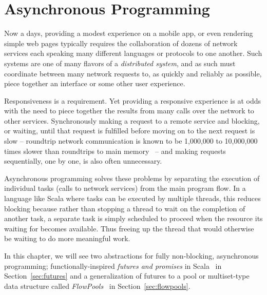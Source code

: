 \chapter{Asynchronous Programming}

Now a days, providing a modest experience on a mobile app, or even rendering
simple web pages typically requires the collaboration of dozens of network
services each speaking many different languages or protocols to one another.
Such systems are one of many flavors of a {\em distributed system}, and as such
must coordinate between many network requests to, as quickly and reliably as
possible, piece together an interface or some other user experience.

Responsiveness is a requirement. Yet providing a responsive experience is at
odds with the need to piece together the results from many calls over the
network to other services. Synchronously making a request to a remote service
and blocking, or waiting, until that request is fulfilled before moving on to
the next request is slow -- roundtrip network communication is known to be
1,000,000 to 10,000,000 times slower than roundtrips to main
memory~\cite{LatencyNumbersEveryProgrammerShouldKnow} -- and making requests
sequentially, one by one, is also often unnecessary.

Asynchronous programming solves these problems by separating the execution of
individual tasks (\eg calls to network services) from the main program flow. In
a language like Scala where tasks can be executed by multiple threads, this
reduces blocking because rather than stopping a thread to wait on the completion
of another task, a separate task is simply scheduled to proceed when the
resource its waiting for becomes available. Thus freeing up the thread that
would otherwise be waiting to do more meaningful work.

In this chapter, we will see two abstractions for fully non-blocking,
asynchronous programming; functionally-inspired {\em futures and promises} in
Scala~\cite{Futures} in Section~\ref{sec:futures} and a generalization of
futures to a pool or multiset-type data structure called {\em
FlowPools}~\cite{FlowPools} in Section~\ref{sec:flowpools}.

